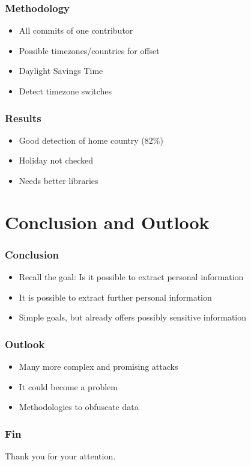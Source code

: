 \documentclass[t]{beamer}
\begin{document}
\begin{frame}
    \frametitle{Methodology}
    \vspace{1cm}
    \begin{itemize}
        \item All commits of one contributor
        \item Possible timezones/countries for offset
        \item Daylight Savings Time
        \item Detect timezone switches
    \end{itemize}
\end{frame}

\begin{frame}
    \frametitle{Results}
    \vspace{1cm}
    \begin{itemize}
        \item Good detection of home country (82\%)
        \pause{}
        \item Holiday not checked
        \pause{}
        \item Needs better libraries
    \end{itemize}
\end{frame}

\section{Conclusion and Outlook}
\begin{frame}
    \frametitle{Conclusion}
    \vspace{1cm}
    \begin{itemize}
        \item Recall the goal: Is it possible to extract personal information
        \pause{}
        \item It is possible to extract further personal information
        \pause{}
        \item Simple goals, but already offers possibly sensitive information
    \end{itemize}
\end{frame}

\begin{frame}
    \frametitle{Outlook}
    \vspace{1cm}
    \begin{itemize}
        \item Many more complex and promising attacks
        \pause{}
        \item It could become a problem
        \pause{}
        \item Methodologies to obfuscate data
    \end{itemize}
\end{frame}


\begin{frame}
    \frametitle{Fin}
    Thank you for your attention.
\end{frame}
\end{document}
